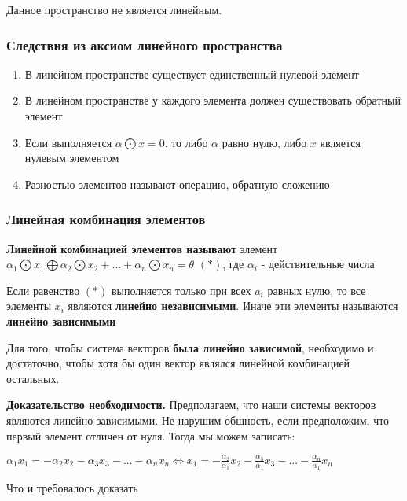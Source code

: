 \documentclass{article}
\begin{document}
\begin{flushleft}
Данное пространство не является линейным.

\subsubsection{Следствия из аксиом линейного пространства}

\begin{enumerate}
    \item В линейном пространстве существует единственный нулевой элемент
    \item В линейном пространстве у каждого элемента должен существовать обратный элемент
    \item Если выполняется $\alpha \bigodot x = 0$, то либо $\alpha$ равно нулю, либо $x$ является нулевым элементом
    \item Разностью элементов называют операцию, обратную сложению
\end{enumerate}

\subsubsection{Линейная комбинация элементов}

\textbf{Линейной комбинацией элементов называют} элемент $\alpha_1 \bigodot x_1 \bigoplus \alpha_2 \bigodot x_2 + ... + \alpha_n \bigodot x_n = \theta$ $(*)$, где $\alpha_i$ - действительные числа 

\hfill

Если равенство $(*)$ выполняется только при всех $a_i$ равных нулю, то все элементы $x_i$ являются \textbf{линейно независимыми}. Иначе эти элементы называются \textbf{линейно зависимыми}

\hfill

Для того, чтобы система векторов \textbf{была линейно зависимой}, необходимо и достаточно, чтобы хотя бы один вектор являлся линейной комбинацией остальных.

\hfill

\textbf{Доказательство необходимости. } Предполагаем, что наши системы векторов являются линейно зависимыми. Не нарушим общность, если предположим, что первый элемент отличен от нуля. Тогда мы можем записать:

$\alpha_1 x_1 = -\alpha_2 x_2 - \alpha_3 x_3 - ... - \alpha_n x_n \Longleftrightarrow x_1 = -\frac{\alpha_2}{\alpha_1} x_2 - \frac{\alpha_3}{\alpha_1} x_3 - ... - \frac{\alpha_n}{\alpha_1} x_n$

Что и требовалось доказать


\end{flushleft}
\end{document}
